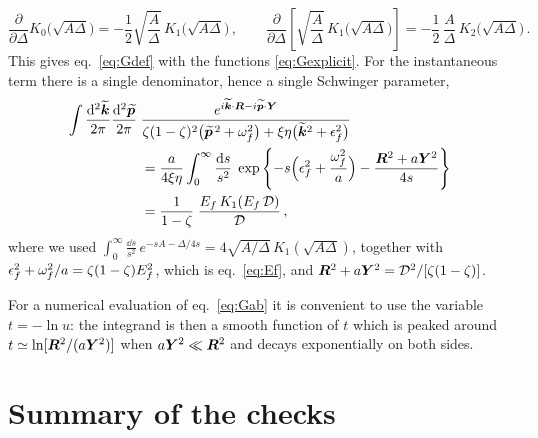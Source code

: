 \begin{equation}
\frac{\partial}{\partial\Delta}K_0\big(\sqrt{A\Delta}\big)=-\frac12\sqrt{\frac{A}{\Delta}}\,K_1\big(\sqrt{A\Delta}\big)\,,\qquad
\frac{\partial}{\partial\Delta}\left[\sqrt{\frac{A}{\Delta}}\,K_1\big(\sqrt{A\Delta}\big)\right]
=-\frac12\,\frac{A}{\Delta}\,K_2\big(\sqrt{A\Delta}\big)\,.
\end{equation}
This gives eq.~\eqref{eq:Gdef} with the functions \eqref{eq:Gexplicit}. For the instantaneous term
there is a single denominator, hence a single Schwinger parameter,
\begin{align}
\int\frac{{\rm d}^2\widetilde{\bm{k}}}{2\pi}\frac{{\rm d}^2\widetilde{\bm{p}}}{2\pi}\;&
\frac{e^{i\widetilde{\bm{k}}\cdot\bm{R}-i\widetilde{\bm{p}}\cdot\bm{Y}}}{\zeta(1-\zeta)^2\big(\widetilde{\bm{p}}^{\,2}+\omega_f^2\big)+\xi\eta\big(\widetilde{\bm{k}}^2+\epsilon_f^2\big)}
\nonumber\\
&=\frac{a}{4\xi\eta}\int_0^\infty\frac{{\rm d} s}{s^2}\;
\exp\left\{-s\Big(\epsilon_f^2+\frac{\omega_f^2}{a}\Big)-\frac{\bm{R}^2+a\bm{Y}^2}{4s}\right\}
\nonumber\\
&=\frac{1}{1-\zeta}\;\frac{E_f\,K_1(E_f\,\mathcal{D})}{\mathcal{D}}\,,
\end{align}
where we used $\int_0^\infty\frac{\dd s}{s^2}\,e^{-sA-\Delta/4s}=4\sqrt{A/\Delta}\,K_1(\sqrt{A\Delta})$,
together with $\epsilon_f^2+\omega_f^2/a=\zeta(1-\zeta)E_f^2$, which is eq.~\eqref{eq:Ef}, and
$\bm{R}^2+a\bm{Y}^2=\mathcal{D}^2/[\zeta(1-\zeta)]$.

For a numerical evaluation of eq.~\eqref{eq:Gab} it is convenient to use the variable $t=-\ln u$: the
integrand is then a smooth function of $t$ which is peaked around $t\simeq\ln[\bm{R}^2/(a\bm{Y}^2)]$ when
$a\bm{Y}^2\ll\bm{R}^2$ and decays exponentially on both sides.

\section{Summary of the checks}
\label{app:checks}

